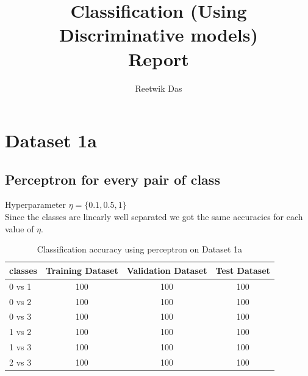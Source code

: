 \documentclass[11pt]{article}
\title{Classification (Using Discriminative models)\\
Report}
\author{Reetwik Das}
\begin{document}
\maketitle
\newpage
\tableofcontents
\listoftables
\listoffigures

\newpage 

\section{Dataset 1a}
\subsection{Perceptron for every pair of class}
Hyperparameter $\eta = \{0.1,0.5,1\}$\\

Since the classes are linearly well separated we got the same accuracies for each value of $\eta$.
\begin{table}[h!]
\label{tab:tab1.1.1}
\begin{center}
\begin{tabular}{|l|c|c|c|}
\hline
\textbf{classes} & \textbf{Training Dataset} & \textbf{Validation Dataset} &\textbf{Test Dataset}\\
\hline
0 vs 1 & 100 & 100 & 100\\
\hline
0 vs 2 & 100 & 100 & 100\\
\hline
0 vs 3 & 100 & 100 & 100\\
\hline
1 vs 2 & 100 & 100 & 100\\
\hline
1 vs 3 & 100 & 100 & 100\\
\hline
2 vs 3 & 100 & 100 & 100\\
\hline
\end{tabular}
\caption{Classification accuracy using perceptron on Dataset 1a}
\end{center}
\end{table}
\end{document}
